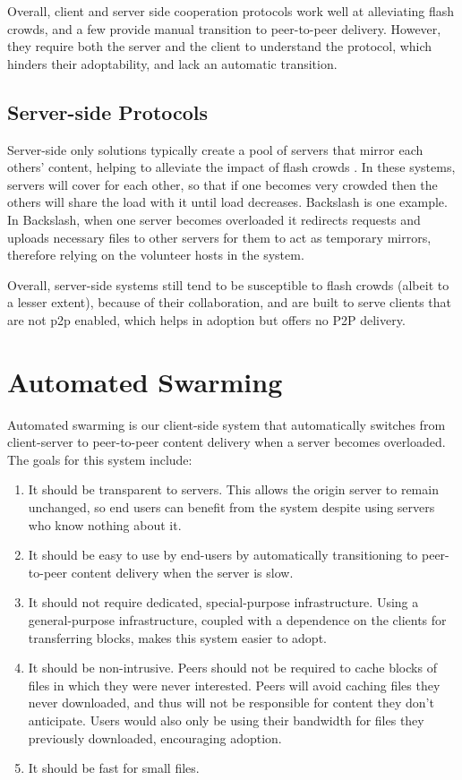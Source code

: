 Overall, client and server side cooperation protocols work well at alleviating flash crowds, and a few provide manual transition to peer-to-peer delivery.  
However, they require both the server and the client to understand the protocol, which hinders their adoptability, and lack an automatic transition.

\section{Server-side Protocols}

Server-side only solutions typically create a pool of servers that mirror each others' content, helping to alleviate the impact of flash crowds \cite{backslash, dotSlash}.  
In these systems, servers will cover for each other, so that if one becomes very crowded then the others will share the load with it until load decreases.  Backslash \cite{backslash} is one example.  In Backslash, when one server becomes overloaded it redirects requests and uploads necessary files to other servers for them to act as temporary mirrors, therefore relying on the volunteer hosts in the system.  

Overall, server-side systems still tend to be susceptible to flash crowds (albeit to a lesser extent), 
because of their collaboration, and are built to serve clients that are not p2p enabled, which helps in adoption but offers no P2P delivery.

\chapter {Automated Swarming}\label{section:solution}

Automated swarming is our client-side system that automatically switches from client-server to peer-to-peer content delivery when a server becomes overloaded.  The goals for this system include:
\begin{enumerate}
\item It should be transparent to servers.  This allows the origin server to remain unchanged, so end users can benefit from the system despite using servers who know nothing about it.
\item It should be easy to use by end-users by automatically transitioning to peer-to-peer content delivery when the server is slow.
\item It should not require dedicated, special-purpose infrastructure.  Using a general-purpose infrastructure, coupled with a dependence on the clients for transferring blocks,
makes this system easier to adopt.
\item It should be non-intrusive.  Peers should not be required to cache blocks of files in which they were never interested.  
Peers will avoid caching files they never downloaded, and thus will not be responsible for content they don't anticipate.  
Users would also only be using their bandwidth for files they previously downloaded, encouraging adoption.
\item It should be fast for small files.
\end{enumerate}
